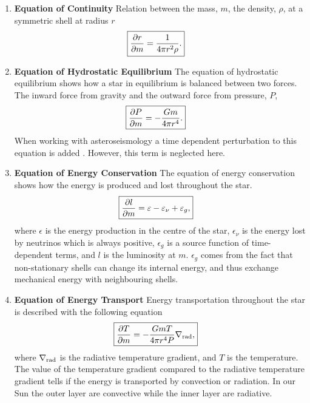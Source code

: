 \begin{enumerate}
    \item \textbf{Equation of Continuity}
        \nicebreak
        Relation between the mass, $m$, the density, $\rho$, at a symmetric
        shell at radius $r$
        \begin{align}
            \Aboxed{\pd{r}{m} &= \frac{1}{4\pi r^2\rho}.}
        \end{align}

    \item \textbf{Equation of Hydrostatic Equilibrium}
        \nicebreak
        The equation of hydrostatic equilibrium shows how a star in equilibrium
        is balanced between two forces. The inward force from gravity and the
        outward force from pressure, $P$,
        \begin{align}
            \Aboxed{\pd{P}{m} &= -\frac{Gm}{4\pi r^4}.}
        \end{align}
        When working with asteroseismology a time dependent perturbation to this
        equation is added \citep[see e.g.][for a thorough discussion]{Aerts2010}.
        However, this term is neglected here.


    \item \textbf{Equation of Energy Conservation}
        \nicebreak
        The equation of energy conservation shows how the energy is produced and
        lost throughout the star.
        \begin{align}
            \Aboxed{\pd{l}{m} = \epsilon - \epsilon_\nu + \epsilon_g,}
        \end{align}
        where $\epsilon$ is the energy production in the centre of the star,
        $\epsilon_\nu$ is the energy lost by neutrinos which is always
        positive, $\epsilon_g$ is a source function of time-dependent terms,
        and $l$ is the luminosity at $m$. $\epsilon_g$ comes from the fact that
        non-stationary shells can change its internal energy, and thus exchange
        mechanical energy with neighbouring shells.

    \item \textbf{Equation of Energy Transport}
        \nicebreak
        Energy transportation throughout the star is described with the
        following equation
        \begin{align}
            \Aboxed{\pd{T}{m} &= -\frac{GmT}{4\pi r^4P}\nabla_\tm{rad},}
        \end{align}
        where $\nabla_{\textnormal{rad}}$ is the radiative temperature gradient, and $T$
        is the temperature. The value of the temperature gradient compared to
        the radiative temperature gradient tells if the energy is transported by
        convection or radiation. In our Sun the outer layer are convective while
        the inner layer are radiative.


\end{enumerate}
